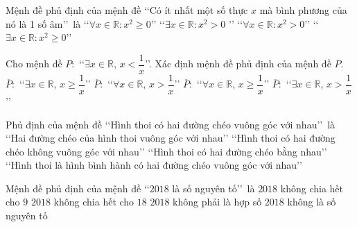 \begin{ex}%
	Mệnh đề phủ định của mệnh đề \lq\lq Có ít nhất  một số thực $x$ mà bình phương của nó là 1 số âm\rq\rq\ là
	\choice 
		{\True \lq\lq $\forall x\in \mathbb{R}:x^2\ge 0$\rq\rq} 
		{\lq\lq $\exists x\in \mathbb{R}:x^2>  0$ \rq\rq}
		{\lq\lq $\forall x\in \mathbb{R}:x^2>  0$\rq\rq}
		 {\lq\lq $\exists x\in \mathbb{R}:x^2\ge 0$\rq\rq}
\end{ex}

\begin{ex}%
	Cho mệnh đề $P\colon$ \lq\lq$\exists x\in \mathbb{R}$, $x<\dfrac{1}{x}$\rq\rq. Xác định mệnh đề phủ  định của mệnh đề $P$.
	\choice 
		{$\overline{P}\colon$ \lq\lq $\exists x\in  \mathbb{R}$, $x\ge \dfrac{1}{x}$\rq\rq}
		{$\overline{P}\colon$ \lq\lq $\forall x\in  \mathbb{R}$, $x> \dfrac{1}{x}$\rq\rq}
		{\True $\overline{P}\colon$ \lq\lq $\forall  x\in \mathbb{R}$, $x\ge \dfrac{1}{x}$\rq\rq}
		 {$\overline{P}\colon$ \lq\lq $\exists x\in \mathbb{R}$, $x> \dfrac{1}{x}$\rq\rq}
\end{ex}

\begin{ex}%
	Phủ định của mệnh đề \lq\lq Hình thoi có  hai đường chéo vuông góc với nhau\rq\rq\ là
	 \choice
		{\lq\lq Hai  đường chéo của hình thoi vuông góc với nhau\rq\rq}
		{\True\lq\lq Hình thoi  có hai đường chéo không vuông góc với nhau\rq\rq}
		{\lq\lq Hình  thoi có hai đường chéo bằng nhau\rq\rq}
		{\lq\lq Hình thoi là hình bình hành có hai đường  chéo vuông góc với nhau\rq\rq}
\end{ex}

\begin{ex}%
	Mệnh đề phủ định của mệnh đề \lq\lq  $2018$ là số nguyên tố\rq\rq \ là
	 \choice
		{$2018$ không  chia hết cho $9$}
		{$2018$ không chia hết cho $18$} 
		{$2018$ không phải  là hợp số}
		{\True$2018$  không là số nguyên tố}
\end{ex}

